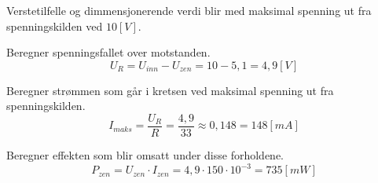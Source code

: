\vspace{0.5cm} %

\begin{solution}[name=Løsningsforslag oppgave]
Verstetilfelle og dimmensjonerende verdi blir med maksimal spenning ut fra spenningskilden ved $10 [V]$.

Beregner spenningsfallet over motstanden.
\[U_R=U_{inn}-U_{zen}=10-5,1=4,9[V]\]
	
Beregner strømmen som går i kretsen ved maksimal spenning ut fra spenningskilden.
\[I_{maks}=\frac{U_R}{R}=\frac{4,9}{33} \approx0,148 = 148 [mA]\]

Beregner effekten som blir omsatt under disse forholdene.
\[P_{zen}=U_{zen}\cdot I_{zen}= 4,9\cdot 150\cdot 10^{-3}=735[mW]\]
	
\end{solution}





